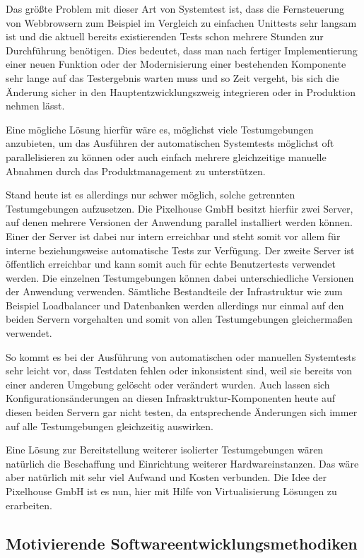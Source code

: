 Das größte Problem mit dieser Art von Systemtest ist, dass die Fernsteuerung von Webbrowsern zum Beispiel im Vergleich zu einfachen Unittests sehr langsam ist und die aktuell bereits existierenden Tests schon mehrere Stunden zur Durchführung benötigen. Dies bedeutet, dass man nach fertiger Implementierung einer neuen Funktion oder der Modernisierung einer bestehenden Komponente sehr lange auf das Testergebnis warten muss und so Zeit vergeht, bis sich die Änderung sicher in den Hauptentzwicklungszweig integrieren oder in Produktion nehmen lässt.

Eine mögliche Lösung hierfür wäre es, möglichst viele Testumgebungen anzubieten, um das Ausführen der automatischen Systemtests möglichst oft parallelisieren zu können oder auch einfach mehrere gleichzeitige manuelle Abnahmen durch das Produktmanagement zu unterstützen.

Stand heute ist es allerdings nur schwer möglich, solche getrennten Testumgebungen aufzusetzen. Die Pixelhouse GmbH besitzt hierfür zwei Server, auf denen mehrere Versionen der Anwendung parallel installiert werden können. Einer der Server ist dabei nur intern erreichbar und steht somit vor allem für interne beziehungsweise automatische Tests zur Verfügung. Der zweite Server ist öffentlich erreichbar und kann somit auch für echte Benutzertests verwendet werden. Die einzelnen Testumgebungen können dabei unterschiedliche Versionen der Anwendung verwenden. Sämtliche Bestandteile der  Infrastruktur wie zum Beispiel Loadbalancer und Datenbanken werden allerdings nur einmal auf den beiden Servern vorgehalten und somit von allen Testumgebungen gleichermaßen verwendet.

So kommt es bei der Ausführung von automatischen oder manuellen Systemtests sehr leicht vor, dass Testdaten fehlen oder inkonsistent sind, weil sie bereits von einer anderen Umgebung gelöscht oder verändert wurden. Auch lassen sich Konfigurationsänderungen an diesen Infrasktruktur-Komponenten heute auf diesen beiden Servern gar nicht testen, da entsprechende Änderungen sich immer auf alle Testumgebungen gleichzeitig auswirken.

Eine Lösung zur Bereitstellung weiterer isolierter Testumgebungen wären natürlich die Beschaffung und Einrichtung weiterer Hardwareinstanzen. Das wäre aber natürlich mit sehr viel Aufwand und Kosten verbunden. Die Idee der Pixelhouse GmbH ist es nun, hier mit Hilfe von Virtualisierung Lösungen zu erarbeiten.

\subsection{Motivierende Softwareentwicklungsmethodiken}

